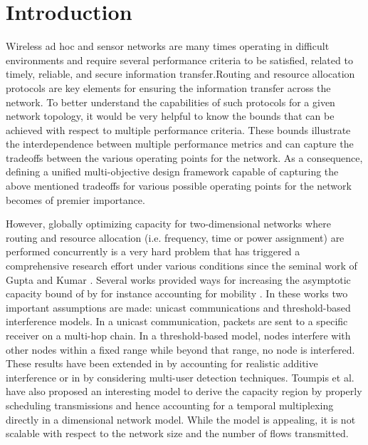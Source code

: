 \documentclass[a4paper]{article}
\begin{document}
\makeRR   



\section{Introduction}\label{sec:introduction}
Wireless ad hoc and sensor networks are many times operating in difficult environments and require several performance criteria to be satisfied, related to timely, reliable, and secure information transfer.Routing and resource allocation protocols are key elements  for ensuring the information transfer across the network.
To better understand the capabilities of such protocols for a given network topology, it would be very helpful to know the bounds that can be achieved with respect to multiple performance criteria. These bounds illustrate the interdependence between multiple performance metrics and can capture the tradeoffs between the various operating points for the network. As a consequence, defining a unified multi-objective design framework capable of capturing the above mentioned tradeoffs for various possible operating points for the network becomes of premier importance.

However, globally optimizing capacity for two-dimensional networks where routing and resource allocation (i.e. frequency, time or power assignment) are performed concurrently is a very hard problem that has triggered a comprehensive research effort under various conditions since the seminal work of Gupta and Kumar \cite{Gupta2000}. Several works provided ways for increasing the asymptotic capacity bound of  \cite{Gupta2000,Wang2008} by for instance accounting for mobility \cite{Grossglauser2002}.
In these works two important assumptions are made: unicast communications and threshold-based interference models.
In a unicast communication, packets are sent to a specific receiver on a multi-hop chain. In a threshold-based model, nodes interfere with other nodes within a fixed range while beyond that range, no node is interfered. 
These results have been extended in \cite{Mhatre2009} by accounting for realistic additive interference or in \cite{Comaniciu2006} by considering multi-user detection techniques. 
Toumpis et al. \cite{toumpis2003} have also proposed an interesting model to derive the capacity region by properly scheduling transmissions and hence accounting for a temporal multiplexing directly in a  dimensional network model. While the model is appealing, it is not scalable with respect to the network size and the number of flows transmitted.
\end{document}
